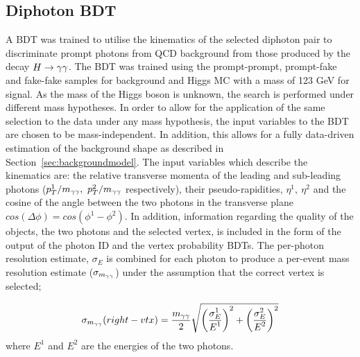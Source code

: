 \subsection{Diphoton BDT}
\label{sec:diphotonbdt}
A BDT was trained to utilise the kinematics of the selected diphoton pair to discriminate prompt photons
from QCD background from those produced by the decay $H\rightarrow\gamma\gamma$. The BDT was trained using the prompt-prompt, prompt-fake
and fake-fake samples for background and Higgs MC with a mass of 123 GeV for signal.
As the mass of the Higgs boson is unknown, the search is performed under different mass hypotheses.
In order to allow for the application of the same selection to the data under any mass hypothesis,
the input variables to the BDT are chosen to be mass-independent. In addition, this allows
for a fully data-driven estimation of the background shape as described in Section~\ref{sec:backgroundmodel}.
The input variables which describe the kinematics are:
the relative transverse momenta of the leading and sub-leading photons ($p_{T}^{1}/m_{\gamma\gamma},~p_{T}^{2}/m_{\gamma\gamma}$ respectively), 
their pseudo-rapidities, $\eta^{1},~\eta^{2}$ and the cosine of the 
angle between the two photons in the transverse plane $cos(\Delta\phi)=cos(\phi^{1}-\phi^{2})$.
In addition, information regarding the quality
of the objects, the two photons and the selected vertex, is included in the form of the output of the 
photon ID and the vertex probability BDTs. The per-photon resolution estimate, $\sigma_{E}$ is combined for
each photon to produce a per-event mass resolution estimate ($\sigma_{m_{\gamma\gamma}}$) under the assumption that 
the correct vertex is selected;

\begin{equation}
\sigma_{m_{\gamma\gamma}} (right-vtx) = \frac{\displaystyle m_{\gamma\gamma}}{\displaystyle 2} 
\sqrt{ \left( \frac{\displaystyle {\sigma_{E}^{1}}}{\displaystyle E^{1} } \right)^{2}
     + \left( \frac{\displaystyle {\sigma_{E}^{2}}}{\displaystyle E^{2} } \right)^{2}
     }
\end{equation}
where $E^{1}$ and $E^{2}$ are the energies of the two photons.

